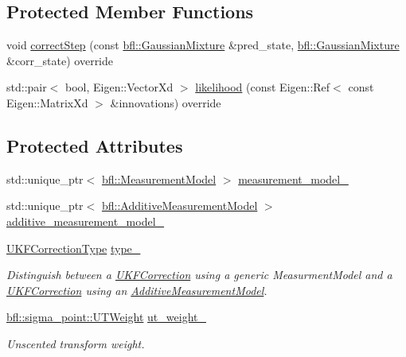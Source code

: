 \subsection*{Protected Member Functions}
\begin{DoxyCompactItemize}
\item 
void \mbox{\hyperlink{classbfl_1_1UKFCorrection_a08786378b99dbf0584edbba15bc89f99}{correct\+Step}} (const \mbox{\hyperlink{classbfl_1_1GaussianMixture}{bfl\+::\+Gaussian\+Mixture}} \&pred\+\_\+state, \mbox{\hyperlink{classbfl_1_1GaussianMixture}{bfl\+::\+Gaussian\+Mixture}} \&corr\+\_\+state) override
\item 
std\+::pair$<$ bool, Eigen\+::\+Vector\+Xd $>$ \mbox{\hyperlink{classbfl_1_1UKFCorrection_a3d1317c9f594540e68748c31b22ea31e}{likelihood}} (const Eigen\+::\+Ref$<$ const Eigen\+::\+Matrix\+Xd $>$ \&innovations) override
\end{DoxyCompactItemize}
\subsection*{Protected Attributes}
\begin{DoxyCompactItemize}
\item 
std\+::unique\+\_\+ptr$<$ \mbox{\hyperlink{classbfl_1_1MeasurementModel}{bfl\+::\+Measurement\+Model}} $>$ \mbox{\hyperlink{classbfl_1_1UKFCorrection_a4547670b106bd50c9f6716e665559000}{measurement\+\_\+model\+\_\+}}
\item 
std\+::unique\+\_\+ptr$<$ \mbox{\hyperlink{classbfl_1_1AdditiveMeasurementModel}{bfl\+::\+Additive\+Measurement\+Model}} $>$ \mbox{\hyperlink{classbfl_1_1UKFCorrection_a6542ea86f241a7f02973f3fd73a736d5}{additive\+\_\+measurement\+\_\+model\+\_\+}}
\item 
\mbox{\hyperlink{classbfl_1_1UKFCorrection_afb5f790b458629da1f1f0e1b7c0a1f0d}{U\+K\+F\+Correction\+Type}} \mbox{\hyperlink{classbfl_1_1UKFCorrection_a9fa808a3b38a3648427c91e1644ec3d9}{type\+\_\+}}
\begin{DoxyCompactList}\small\item\em Distinguish between a \mbox{\hyperlink{classbfl_1_1UKFCorrection}{U\+K\+F\+Correction}} using a generic Measurment\+Model and a \mbox{\hyperlink{classbfl_1_1UKFCorrection}{U\+K\+F\+Correction}} using an \mbox{\hyperlink{classbfl_1_1AdditiveMeasurementModel}{Additive\+Measurement\+Model}}. \end{DoxyCompactList}\item 
\mbox{\hyperlink{structbfl_1_1sigma__point_1_1UTWeight}{bfl\+::sigma\+\_\+point\+::\+U\+T\+Weight}} \mbox{\hyperlink{classbfl_1_1UKFCorrection_acbf78f4c885eb1721ffea18c62ce5dec}{ut\+\_\+weight\+\_\+}}
\begin{DoxyCompactList}\small\item\em Unscented transform weight. \end{DoxyCompactList}\end{DoxyCompactItemize}


